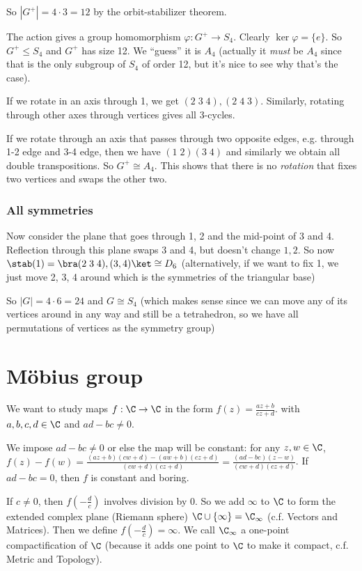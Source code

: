 \documentclass[a4pape]{article}
\begin{document}
So $|G^+| = 4\cdot 3 = 12$ by the orbit-stabilizer theorem.

The action gives a group homomorphism $\varphi: G^+ \to S_4$. Clearly $\ker \varphi = \{e\}$. So $G^+ \leq S_4$ and $G^+$ has size 12. We ``guess'' it is $A_4$ (actually it \emph{must} be $A_4$ since that is the only subgroup of $S_4$ of order 12, but it's nice to see why that's the case).

If we rotate in an axis through 1, we get $(2\; 3\; 4), (2\; 4\; 3)$. Similarly, rotating through other axes through vertices gives all 3-cycles. 

If we rotate through an axis that passes through two opposite edges, e.g. through 1-2 edge and 3-4 edge, then we have $(1\; 2)(3\; 4)$ and similarly we obtain all double transpositions. So $G^+ \cong A_4$. This shows that there is no \emph{rotation} that fixes two vertices and swaps the other two. 

\subsubsection{All symmetries}
Now consider the plane that goes through 1, 2 and the mid-point of 3 and 4. Reflection through this plane swaps 3 and 4, but doesn't change $1, 2$. So now $\stab(1) = \bra (2\; 3\; 4), (3, 4)\ket \cong D_6$ (alternatively, if we want to fix 1, we just move 2, 3, 4 around which is the symmetries of the triangular base)

So $|G| = 4\cdot 6 = 24$ and $G\cong S_4$ (which makes sense since we can move any of its vertices around in any way and still be a tetrahedron, so we have all permutations of vertices as the symmetry group)

\section{M\"obius group}
We want to study maps $f: \C \to \C$ in the form $f(z) = \frac{az + b}{cz + d}$. with $a, b, c, d\in \C$ and $ad - bc \not= 0$.

We impose $ad - bc\not= 0$ or else the map will be constant: for any $z, w\in \C$, $f(z) - f(w) = \frac{(az + b)(cw + d) - (aw + b)(cz + d)}{(cw + d)(cz + d)} = \frac{(ad - bc)(z - w)}{(cw + d)(cz + d)}$. If $ad - bc = 0$, then $f$ is constant and boring.

If $c\not=0$, then $f(-\frac{d}{c})$ involves division by 0. So we add $\infty$ to $\C$ to form the extended complex plane (Riemann sphere) $\C\cup \{\infty\}= \C_\infty$ (c.f. Vectors and Matrices). Then we define $f(-\frac{d}{c}) = \infty$. We call $\C_\infty$ a one-point compactification of $\C$ (because it adds one point to $\C$ to make it compact, c.f. Metric and Topology).
\end{document}
